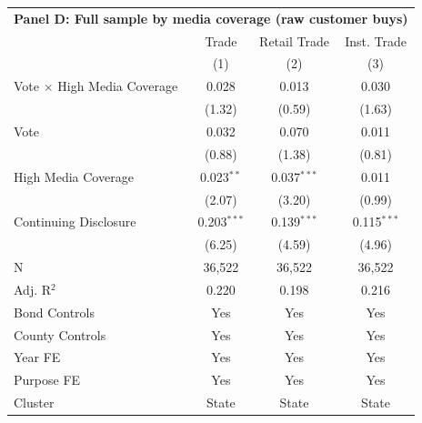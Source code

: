 \begingroup
\centering
\begin{tabular*}{\textwidth}{@{\extracolsep{\fill}}lccc}
\multicolumn{5}{l}{\textbf{Panel D: Full sample by media coverage (raw customer buys)}}\\

\addlinespace
   \toprule
                                      & Trade         & Retail Trade  & Inst. Trade\\  
                                      & (1)           & (2)           & (3)\\  
   \midrule 
   Vote $\times$ High Media Coverage  & 0.028         & 0.013         & 0.030\\   
                                      & (1.32)       & (0.59)       & (1.63)\\   
   Vote                               & 0.032         & 0.070         & 0.011\\   
                                      & (0.88)       & (1.38)       & (0.81)\\   
   High Media Coverage                & 0.023$^{**}$  & 0.037$^{***}$ & 0.011\\   
                                      & (2.07)       & (3.20)       & (0.99)\\   
   Continuing Disclosure              & 0.203$^{***}$ & 0.139$^{***}$ & 0.115$^{***}$\\   
                                      & (6.25)       & (4.59)       & (4.96)\\   
   \hline
   N                       & 36,522        & 36,522        & 36,522\\  
   Adj. R$^2$                     & 0.220         & 0.198         & 0.216\\  
   Bond Controls                      & Yes           & Yes           & Yes\\  
   County Controls                    & Yes           & Yes           & Yes\\  
   Year FE                            & Yes           & Yes           & Yes\\  
   Purpose FE                         & Yes           & Yes           & Yes\\  
   Cluster              & State & State & State\\  
   \bottomrule
\end{tabular*}
\par\endgroup
